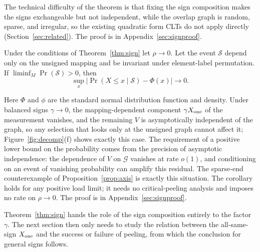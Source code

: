 The technical difficulty of the theorem is that fixing the sign composition makes the signs exchangeable but not independent, while the overlap graph
is random, sparse, and irregular, so the existing quadratic form CLTs do not apply directly (Section~\ref{sec:related}).
The proof is in Appendix~\ref{sec:signproof}.

\begin{corollary}\label{cor:balanced}
Under the conditions of Theorem~\ref{thm:sign} let $\rho\to0$. Let the event $\mathcal S$ depend only on the unsigned mapping
and be invariant under element-label permutation. If $\liminf_M\Pr(\mathcal S)>0$, then
\begin{equation*}
\sup_x\left|\Pr(X\le x\mid \mathcal S)-\Phi(x)\right|\longrightarrow0.
\end{equation*}
\end{corollary}
Here $\Phi$ and $\phi$ are the standard normal distribution function and density. Under balanced signs $\gamma\to0$,
the mapping-dependent component $\gamma X_{\rm one}$ of the measurement vanishes, and the remaining $V$ is asymptotically independent of the graph,
so any selection that looks only at the unsigned graph cannot affect it; Figure~\ref{fig:decomp}(f) shows exactly this case. The requirement of a positive lower bound on the probability comes from the precision of asymptotic independence: the dependence of $V$ on $\mathcal G$ vanishes at rate $o(1)$,
and conditioning on an event of vanishing probability can amplify this residual. The sparse-end counterexample of Proposition~\ref{prop:axis} is exactly this situation.
The corollary holds for any positive load limit; it needs no critical-peeling analysis and imposes no rate on $\rho\to0$.
The proof is in Appendix~\ref{sec:signproof}.

Theorem~\ref{thm:sign} hands the role of the sign composition entirely to the factor $\gamma$. The next section then only needs to study the relation between the all-same-sign
$X_{\rm one}$ and the success or failure of peeling, from which the conclusion for general signs follows.
